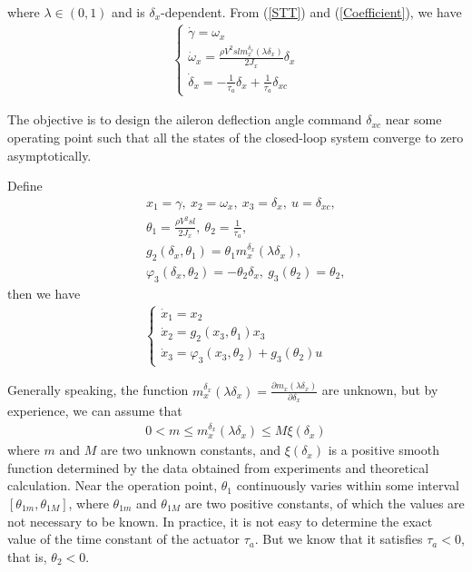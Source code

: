 \documentclass{tSYS2e}
\theoremstyle{plain}
\theoremstyle{definition}
\begin{document}
where $\lambda \in (0,1)$ and is $\delta_x$-dependent.
From (\ref{STT}) and (\ref{Coefficient}), we have
\begin{eqnarray}
\left\{
\begin{array}{l}
\dot{\gamma}=\omega _{x} \\
\dot{\omega}_{x}=\frac{\rho V^{2}slm_{x}^{\delta _{x}}(\lambda \delta _{x})}{
2J_{x}}\delta _{x} \\
\dot{\delta}_{x}=-\frac{1}{\tau_a}\delta _{x}+\frac{1}{\tau_a}\delta _{xc}
\end{array}
\right.  \label{STT1}
\end{eqnarray}

The objective is to design the aileron deflection angle command $\delta
_{xc} $ near some operating point such that all the states of the closed-loop system
converge to zero asymptotically.

Define
\begin{eqnarray*}
&&x_{1}=\gamma,~x_{2}=\omega _{x},~x_{3}=\delta _{x},~u=\delta _{xc},\nonumber\\
&&\theta_1=\frac{\rho V^{2}sl}{2J_{x}},~\theta_2=\frac{1}{\tau_a},\nonumber\\
&&g_{2}(\delta_{x},\theta_1)=\theta_1m_{x}^{\delta _{x}}(\lambda\delta _{x}),\nonumber\\
&&\varphi _{3}(\delta _{x},\theta_2)=-\theta_2\delta _{x},~g_{3}(\theta_2)=\theta_2,
\end{eqnarray*}
then we have
\begin{eqnarray}
\left\{
\begin{array}{l}
\dot{x}_{1}=x_{2} \\
\dot{x}_{2}=g_{2}(x_{3},\theta_1)x_{3} \\
\dot{x}_{3}=\varphi _{3}(x_{3},\theta_2)+g_{3}(\theta_2)u
\end{array}
\right.   \label{STT2}
\end{eqnarray}

Generally speaking, the function $m_{x}^{\delta _{x}}(\lambda \delta
_{x})=\frac{\partial m_{x}(\lambda \delta _{x})}{\partial \delta _{x}}$ are
unknown, but by experience, we can assume that
\begin{eqnarray*}
0<m\leq m_{x}^{\delta _{x}}(\lambda \delta _{x})\leq M \xi(\delta _{x})
\end{eqnarray*}
where $m$ and $M$ are two unknown constants,
and $\xi(\delta _{x})$ is a positive smooth function determined by the data obtained from experiments and theoretical
calculation. Near the operation point, $\theta_1$ continuously varies within some interval $[\theta_{1m}, \theta_{1M}]$,
where $\theta_{1m}$ and $\theta_{1M}$ are two positive constants, of which the values are not necessary to be known.
In practice, it is not easy to determine the exact value of the time constant of the actuator $\tau_a$.
But we know that it satisfies $\tau_a<0$, that is, $\theta_2<0$.
\end{document}
